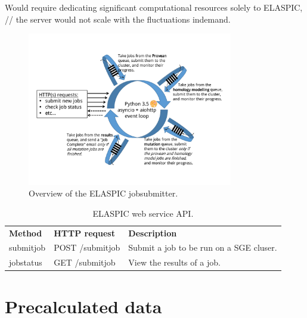 Would require dedicating significant computational resources solely to ELASPIC, // the server would not scale with the fluctuations indemand.




\begin{figure}[!tb]
	\centering
	\includegraphics[width=0.8\textwidth]{static/elaspic/elaspic_jobsubmitter.pdf}
	\caption[ELASPIC webservice.]{Overview of the ELASPIC jobsubmitter.}
	\label{fig:elaspic_jobsubmitter}
\end{figure}


\begin{table}[!tb]
	\centering
	\caption{ELASPIC web service API.}
	\label{tab:elaspic_jobsubmitter}
	\begin{tabular}{lll}
	\textbf{Method} & \textbf{HTTP request} & \textbf{Description} \\
	submitjob & POST /submitjob & Submit a job to be run on a SGE cluser. \\
	jobstatus & GET /submitjob & View the results of a job.
	\end{tabular}
\end{table}



\section{Precalculated data}

